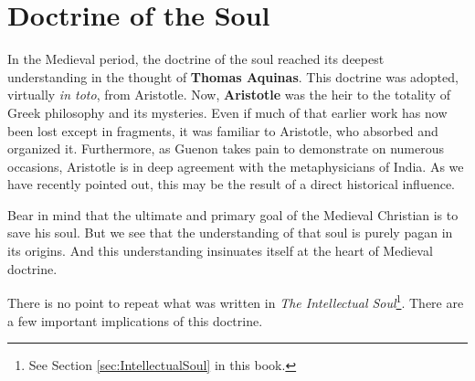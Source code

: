 \section{Doctrine of the Soul}

\label{sec:DoctrineSoul}

In the Medieval period, the doctrine of the soul reached its deepest understanding in the thought of \textbf{Thomas Aquinas}. This doctrine was adopted, virtually \emph{in toto}, from Aristotle. Now, \textbf{Aristotle} was the heir to the totality of Greek philosophy and its mysteries. Even if much of that earlier work has now been lost except in fragments, it was familiar to Aristotle, who absorbed and organized it. Furthermore, as Guenon takes pain to demonstrate on numerous occasions, Aristotle is in deep agreement with the metaphysicians of India. As we have recently pointed out, this may be the result of a direct historical influence.

Bear in mind that the ultimate and primary goal of the Medieval Christian is to save his soul. But we see that the understanding of that soul is purely pagan in its origins. And this understanding insinuates itself at the heart of Medieval doctrine.

There is no point to repeat what was written in \textit{The Intellectual Soul}\footnote{See Section \ref{sec:IntellectualSoul} in this book.}. There are a few important implications of this doctrine.

